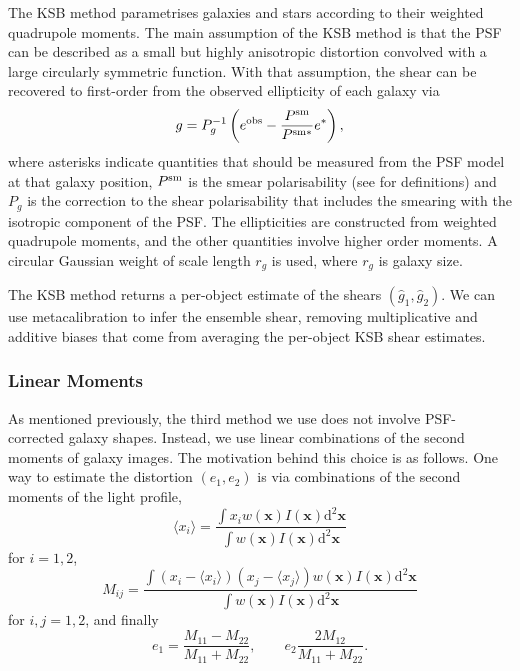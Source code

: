 \documentclass[iop]{emulateapj}
\begin{document}
The KSB method \citep{1995ApJ...449..460K} parametrises galaxies and
stars according to their weighted quadrupole moments.  The main
assumption of the KSB method is that the PSF can be described as a
small but highly anisotropic distortion convolved with a large
circularly symmetric function.  With that assumption, the shear can be
recovered to first-order from the observed ellipticity of each galaxy
via
\begin{equation} \label{eqn:weight}
g=P_{g}^{-1}\left(e^{\rm obs}-\frac{P^{\rm sm}}{P^{\rm sm*}}e^{*}\right),
\end{equation}
where asterisks indicate quantities that should be measured from the
PSF model at that galaxy position, $P^{\rm sm}$ is the smear
polarisability (see \citealt{2006MNRAS.368.1323H} for definitions) and
$P_g$ is the correction to the shear polarisability that includes
the smearing with the isotropic component of the PSF. The
ellipticities are constructed from weighted quadrupole moments, and
the other quantities involve higher order moments. A circular Gaussian
weight of scale length $r_g$ is used, where $r_g$ is galaxy size.

The KSB method returns a per-object estimate of the shears
$(\hat{g}_1, \hat{g}_2)$. We can use metacalibration to
infer the ensemble shear, removing multiplicative and additive biases that come from averaging the
per-object KSB shear estimates.

\subsubsection{Linear Moments}

As mentioned previously, the third method we use does not involve
PSF-corrected galaxy shapes.  Instead, we use linear combinations of
the second moments of galaxy images.  The motivation behind this
choice is as follows.  One way to estimate the distortion $(e_1,e_2)$
is via combinations of the second moments of the light profile,
\begin{equation}
\langle x_i\rangle = \frac{\int x_i w({\mathbf x}) I({\mathbf x}) \mathrm{d}^2{\mathbf x}}{\int w({\mathbf x}) I({\mathbf x}) \mathrm{d}^2{\mathbf x}}
\end{equation}
for $i=1, 2$,
\begin{equation}
M_{ij} = \frac{\int (x_i-\langle x_i\rangle)(x_j-\langle x_j\rangle) w({\mathbf x}) I({\mathbf x}) \mathrm{d}^2{\mathbf x}}{\int w({\mathbf x}) I({\mathbf x}) \mathrm{d}^2{\mathbf x}}
\end{equation}
for $i,j=1,2$, and finally 
\begin{equation}\label{eq:moments-div}
e_1 = \frac{M_{11}-M_{22}}{M_{11}+M_{22}}, \qquad e_2 \frac{2M_{12}}{M_{11}+M_{22}}.
\end{equation}
\end{document}

